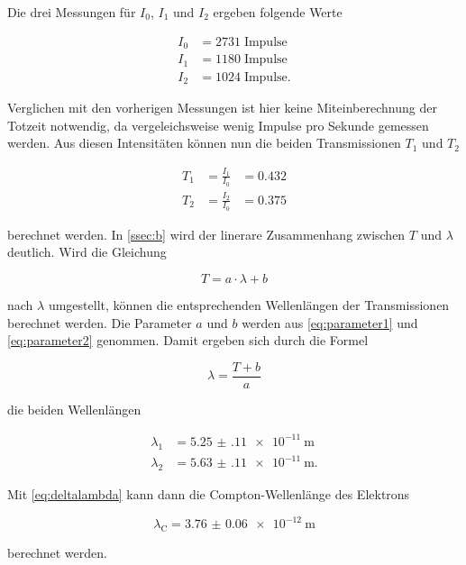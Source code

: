 Die drei Messungen für $I_0$, $I_1$ und $I_2$ ergeben folgende Werte

\begin{align*}
    I_0 &= 2731 \; \text{Impulse}\\
    I_1 &= 1180 \; \text{Impulse}\\
    I_2 &= 1024 \; \text{Impulse}.
\end{align*}

Verglichen mit den vorherigen Messungen ist hier keine Miteinberechnung der Totzeit notwendig, da vergeleichsweise wenig Impulse pro Sekunde gemessen werden.
Aus diesen Intensitäten können nun die beiden Transmissionen $T_1$ und $T_2$

\begin{align*}
    T_1 &= \frac{I_1}{I_0} &= 0.432\\
    T_2 &= \frac{I_2}{I_0} &= 0.375
\end{align*}

berechnet werden.
In \autoref{ssec:b} wird der linerare Zusammenhang zwischen $T$ und $\lambda$ deutlich.
Wird die Gleichung 

\begin{equation}
    T = a \cdot \lambda + b
\end{equation}

nach $\lambda$ umgestellt, können die entsprechenden Wellenlängen der Transmissionen berechnet werden.
Die Parameter $a$ und $b$ werden aus \autoref{eq:parameter1} und \autoref{eq:parameter2} genommen.
Damit ergeben sich durch die Formel 

\begin{equation}
    \lambda = \frac{T + b}{a}
\end{equation}

die beiden Wellenlängen

\begin{align*}
    \lambda _1 &= \SI{5.25(11)e-11}{\meter}\\
    \lambda _2 &= \SI{5.63(11)e-11}{\meter}.
\end{align*}

Mit \autoref{eq:deltalambda} kann dann die Compton-Wellenlänge des Elektrons

\begin{equation}
    \lambda _\text{C} = \SI{3.76(6)e-12}{\meter}
\end{equation}

berechnet werden.